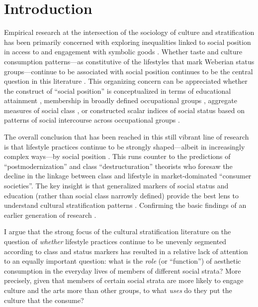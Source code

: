 \documentclass[11pt]{article}
\begin{document}
\newpage
\doublespacing
\section{Introduction} 
Empirical research at the intersection of the sociology of culture and stratification has been primarily concerned  with exploring inequalities linked to social position in access to and engagement with symbolic goods  \citep{dimaggio00, vaneijck00, katzgerro04}.  Whether taste and culture consumption patterns---as constitutive of the lifestyles that mark Weberian status groups---continue to be associated with social position continues to be the central question in this literature \citep{tomlinson03, katzgerro04}.  This organizing concern can be appreciated whether the construct of ``social position'' is conceptualized in terms of educational attainment \citep{bourdieu_darbel91, bryson96, vaneijck99}, membership in broadly defined occupational groups \citep{bourdieu84, dimaggio_useem78a, dimaggio_useem78b, peterson_simkus93, tomlinson03}, aggregate measures of social class \citep{katzgerro_shavit98, katzgerro02, katzgerro06}, or constructed scalar indices of social status based on patterns of social intercourse across occupational groups \citep{chan_goldthorpe05, chan_goldthorpe07a, chan_goldthorpe07b}. 

The overall conclusion that has been reached in this still vibrant line of research is that lifestyle practices continue to be strongly shaped---albeit in increasingly complex ways---by social position \citep{holt98, katzgerro99, tomlinson03, emmison03, warde_etal08}.  This runs counter to the predictions of ``postmodernization'' and class ``destructuration'' theorists who foresaw the decline in the linkage between class and lifestyle in market-dominated ``consumer societies''\citep[e.g.][]{baudrillard06, kingston00, pakulski_waters96}.  The key insight is that generalized markers of social status and education (rather than social class narrowly defined) provide the best lens to understand cultural stratification patterns \citep{alderson_etal07,chan_goldthorpe07a, chan_goldthorpe07b, katzgerro02, katzgerro04, sullivan_katzgerro07, silva06, bennett_etal99, emmison03, ollivier04}.  Confirming the basic findings of an earlier generation of research \citep{baumol_bowen66, dimaggio_useem78a, ganzeboom82}.

I argue that the strong focus of the cultural stratification literature on the question of \emph{whether} lifestyle practices continue to be unevenly segmented according to class and status markers has resulted in a relative lack of attention to an equally important question:  what is the \emph{role} (or ``function'') of aesthetic consumption in the everyday lives of members of different social strata?  More precisely, given that members of certain social strata are more likely to engage culture and the arts more than other groups, to what \emph{uses} do they put the culture that the consume?  
\end{document}
